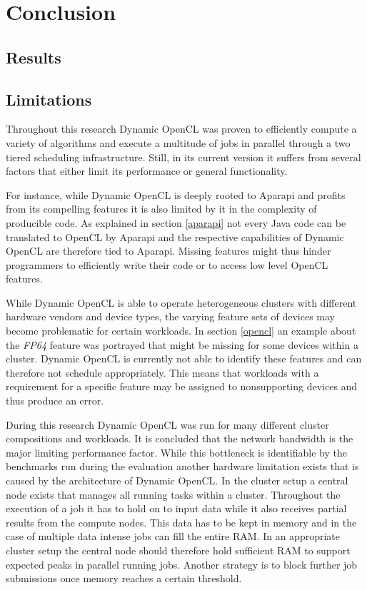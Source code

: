 \chapter{Conclusion}

\section{Results}

\section{Limitations}

Throughout this research Dynamic OpenCL was proven to efficiently compute a variety of algorithms and  execute a multitude of jobs in parallel through a two tiered scheduling infrastructure. Still, in its current version it suffers from several factors that either limit its performance or general functionality.

For instance, while Dynamic OpenCL is deeply rooted to Aparapi and profits from its compelling features it is also limited by it in the complexity of producible code. As explained in section \ref{aparapi} not every Java code can be translated to OpenCL by Aparapi and the respective capabilities of Dynamic OpenCL are therefore tied to Aparapi. Missing features might thus hinder programmers to efficiently write their code or to access low level OpenCL features.

While Dynamic OpenCL is able to operate heterogeneous clusters with different hardware vendors and device types, the varying feature sets of devices may become problematic for certain workloads. In section \ref{opencl} an example about the \textit{FP64} feature was portrayed that might be missing for some devices within a cluster. Dynamic OpenCL is currently not able to identify these features and can therefore not schedule appropriately. This means that workloads with a requirement for a specific feature may be assigned to nonsupporting devices and thus produce an error.

During this research Dynamic OpenCL was run for many different cluster compositions and workloads. It is concluded that the network bandwidth is the major limiting performance factor. While this bottleneck is identifiable by the benchmarks run during the evaluation another hardware limitation exists that is caused by the architecture of Dynamic OpenCL. In the cluster setup a central node exists that manages all running tasks within a cluster. Throughout the execution of a job it has to hold on to input data while it also receives partial results from the compute nodes. This data has to be kept in memory and in the case of multiple data intense jobs can fill the entire RAM. In an appropriate cluster setup the central node should therefore hold sufficient RAM to support expected peaks in parallel running jobs. Another strategy is to block further job submissions once memory reaches a certain threshold.

